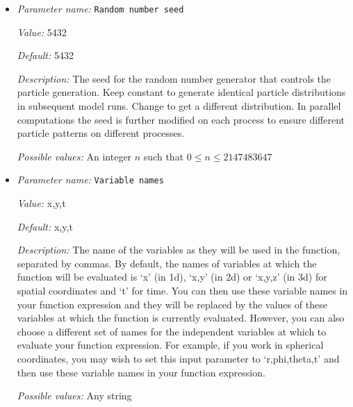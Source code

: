 \begin{itemize}
{\it Value:} true


{\it Default:} true


{\it Description:} If true, particle numbers per cell are calculated randomly according to their respective probability density. This means particle numbers per cell can deviate statistically from the integral of the probability density. If false, first determine how many particles each cell should have based on the integral of the density over each of the cells, and then once we know how many particles we want on each cell, choose their locations randomly within each cell.


{\it Possible values:} A boolean value (true or false)
\item {\it Parameter name:} {\tt Random number seed}
\label{parameters:Postprocess/Particles/Generator/Probability density function/Random number seed}


{\it Value:} 5432


{\it Default:} 5432


{\it Description:} The seed for the random number generator that controls the particle generation. Keep constant to generate identical particle distributions in subsequent model runs. Change to get a different distribution. In parallel computations the seed is further modified on each process to ensure different particle patterns on different processes.


{\it Possible values:} An integer $n$ such that $0\leq n \leq 2147483647$
\item {\it Parameter name:} {\tt Variable names}
\label{parameters:Postprocess/Particles/Generator/Probability density function/Variable names}


{\it Value:} x,y,t


{\it Default:} x,y,t


{\it Description:} The name of the variables as they will be used in the function, separated by commas. By default, the names of variables at which the function will be evaluated is `x' (in 1d), `x,y' (in 2d) or `x,y,z' (in 3d) for spatial coordinates and `t' for time. You can then use these variable names in your function expression and they will be replaced by the values of these variables at which the function is currently evaluated. However, you can also choose a different set of names for the independent variables at which to evaluate your function expression. For example, if you work in spherical coordinates, you may wish to set this input parameter to `r,phi,theta,t' and then use these variable names in your function expression.


{\it Possible values:} Any string
\end{itemize}

